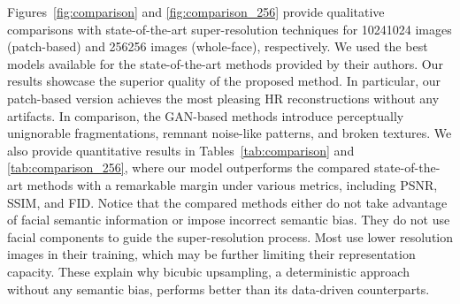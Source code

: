 \documentclass[10pt,twocolumn,letterpaper]{article}
\begin{document}
Figures~\ref{fig:comparison} and \ref{fig:comparison_256} provide qualitative comparisons with state-of-the-art super-resolution techniques for 10241024 images (patch-based) and 256256 images (whole-face), respectively. We used the best models available for the state-of-the-art methods provided by their authors. Our results showcase the superior quality of the proposed method. In particular, our patch-based version achieves the most pleasing HR reconstructions without any artifacts. In comparison, the GAN-based methods introduce perceptually unignorable fragmentations, remnant noise-like patterns, and broken textures. We also provide quantitative results in Tables~\ref{tab:comparison} and \ref{tab:comparison_256}, where our model outperforms the compared state-of-the-art methods with a remarkable margin under various metrics, including PSNR, SSIM, and FID. Notice that the compared methods either do not take advantage of facial semantic information or impose incorrect semantic bias. They do not use facial components to guide the super-resolution process. Most use lower resolution images in their training, which may be further limiting their representation capacity. These explain why bicubic upsampling, a deterministic approach without any semantic bias, performs better than its data-driven counterparts.
\end{document}
